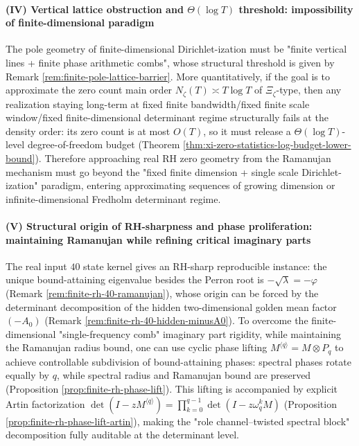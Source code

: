 \paragraph{(IV) Vertical lattice obstruction and \texorpdfstring{$\Theta(\log T)$}{Theta(log T)} threshold: impossibility of finite-dimensional paradigm}
The pole geometry of finite-dimensional Dirichlet-ization must be "finite vertical lines + finite phase arithmetic combs", whose structural threshold is given by Remark \ref{rem:finite-pole-lattice-barrier}.
More quantitatively, if the goal is to approximate the zero count main order \(N_{\zeta}(T)\asymp T\log T\) of \(\Xi_{\zeta}\)-type, then any realization staying long-term at fixed finite bandwidth/fixed finite scale window/fixed finite-dimensional determinant regime structurally fails at the density order: its zero count is at most \(O(T)\), so it must release a \(\Theta(\log T)\)-level degree-of-freedom budget (Theorem \ref{thm:xi-zero-statistics-log-budget-lower-bound}).
Therefore approaching real RH zero geometry from the Ramanujan mechanism must go beyond the "fixed finite dimension + single scale Dirichlet-ization" paradigm, entering approximating sequences of growing dimension or infinite-dimensional Fredholm determinant regime.

\paragraph{(V) Structural origin of RH-sharpness and phase proliferation: maintaining Ramanujan while refining critical imaginary parts}
The real input \(40\) state kernel gives an RH-sharp reproducible instance: the unique bound-attaining eigenvalue besides the Perron root is \(-\sqrt{\lambda}=-\varphi\) (Remark \ref{rem:finite-rh-40-ramanujan}), whose origin can be forced by the determinant decomposition of the hidden two-dimensional golden mean factor \((-A_0)\) (Remark \ref{rem:finite-rh-40-hidden-minusA0}).
To overcome the finite-dimensional "single-frequency comb" imaginary part rigidity, while maintaining the Ramanujan radius bound, one can use cyclic phase lifting
\(
M^{\langle q\rangle}=M\otimes P_q
\)
to achieve controllable subdivision of bound-attaining phases: spectral phases rotate equally by \(q\), while spectral radius and Ramanujan bound are preserved (Proposition \ref{prop:finite-rh-phase-lift}).
This lifting is accompanied by explicit Artin factorization
\(
\det(I-zM^{\langle q\rangle})=\prod_{k=0}^{q-1}\det(I-z\omega_q^k M)
\)
(Proposition \ref{prop:finite-rh-phase-lift-artin}), making the "role channel--twisted spectral block" decomposition fully auditable at the determinant level.

